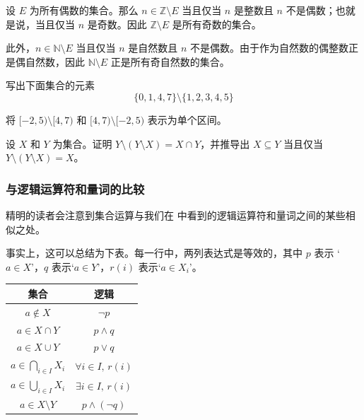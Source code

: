 \begin{example}
设 $E$ 为所有偶数的集合。那么 $n \in \mathbb{Z} \setminus E$ 当且仅当 $n$ 是整数且 $n$ 不是偶数；也就是说，当且仅当 $n$ 是奇数。因此 $\mathbb{Z} \setminus E$ 是所有奇数的集合。

此外，$n \in \mathbb{N} \setminus E$ 当且仅当 $n$ 是自然数且 $n$ 不是偶数。由于作为自然数的偶整数正是偶自然数，因此 $\mathbb{N} \setminus E$ 正是所有奇自然数的集合。
\end{example}

\begin{exercise}
写出下面集合的元素
\[ \{ 0, 1, 4, 7 \} \setminus \{ 1, 2, 3, 4, 5 \} \]
\end{exercise}

\begin{exercise}
将 $[-2,5) \setminus [4,7)$ 和 $[4,7) \setminus [-2,5)$ 表示为单个区间。
\end{exercise}

\begin{exercise}
\label{exSetMinusSetMinus}
设 $X$ 和 $Y$ 为集合。证明 $Y \setminus (Y \setminus X)= X \cap Y$，并推导出 $X \subseteq Y$ 当且仅当 $Y \setminus (Y \setminus X) = X$。
\end{exercise}

\subsubsection*{与逻辑运算符和量词的比较}

精明的读者会注意到集合运算与我们在  中看到的逻辑运算符和量词之间的某些相似之处。

事实上，这可以总结为下表。每一行中，两列表达式是等效的，其中 $p$ 表示 `$a \in X$'，$q$ 表示`$a \in Y$'，$r(i)$ 表示`$a \in X_i$'。

\begin{center}\begin{tabular}{c|c}
集合 & 逻辑 \\ \hline
$a \not\in X$ & $\neg p$ \\
$a \in X \cap Y$ & $p \wedge q$ \\
$a \in X \cup Y$ & $p \vee q$ \\
$a \in \bigcap_{i \in I} X_i$ & $\forall i \in I,\, r(i)$ \\
$a \in \bigcup_{i \in I} X_i$ & $\exists i \in I,\, r(i)$ \\
$a \in X \setminus Y$ & $p \wedge (\neg q)$
\end{tabular}\end{center}

